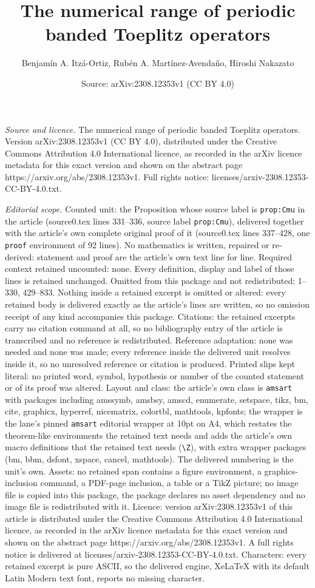 \documentclass[10pt,a4paper]{amsart}
\title[The numerical range of periodic banded Toeplitz operators]{The numerical range of periodic banded Toeplitz operators}
\author{Benjam\'in A. Itz\'a-Ortiz, Rub\'en A. Mart\'inez-Avenda\~no, Hiroshi Nakazato}
\date{Source: arXiv:2308.12353v1 (CC BY 4.0)}
\begin{document}
\maketitle

\noindent\emph{Source and licence.} The numerical range of periodic banded Toeplitz operators. Version arXiv:2308.12353v1 (CC BY 4.0), distributed under the Creative Commons Attribution 4.0 International licence, as recorded in the arXiv licence metadata for this exact version and shown on the abstract page https://arxiv.org/abs/2308.12353v1. Full rights notice: licenses/arxiv-2308.12353-CC-BY-4.0.txt.\par\smallskip

\noindent\textit{Editorial scope.} Counted unit: the Proposition whose source label is \texttt{prop:Cmu} in the article (source0.tex lines 331--336, source label \texttt{prop:Cmu}), delivered together with the article's own complete original proof of it (source0.tex lines 337--428, one \texttt{proof} environment of 92 lines). No mathematics is written, repaired or re-derived: statement and proof are the article's own text line for line. Required context retained uncounted: none. Every definition, display and label of those lines is retained unchanged. Omitted from this package and not redistributed: 1--330, 429--833. Nothing inside a retained excerpt is omitted or altered: every retained body is delivered exactly as the article's lines are written, so no omission receipt of any kind accompanies this package. Citations: the retained excerpts carry no citation command at all, so no bibliography entry of the article is transcribed and no reference is redistributed. Reference adaptation: none was needed and none was made; every reference inside the delivered unit resolves inside it, so no unresolved reference or citation is produced. Printed slips kept literal: no printed word, symbol, hypothesis or number of the counted statement or of its proof was altered. Layout and class: the article's own class is \texttt{amsart} with packages including amssymb, amsbsy, amscd, enumerate, setspace, tikz, bm, cite, graphicx, hyperref, nicematrix, colortbl, mathtools, kpfonts; the wrapper is the lane's pinned \texttt{amsart} editorial wrapper at 10pt on A4, which restates the theorem-like environments the retained text needs and adds the article's own macro definitions that the retained text needs (\texttt{\textbackslash Z}), with extra wrapper packages (bm, bbm, dsfont, xspace, cancel, mathtools). The delivered numbering is the unit's own. Assets: no retained span contains a figure environment, a graphics-inclusion command, a PDF-page inclusion, a table or a TikZ picture; no image file is copied into this package, the package declares no asset dependency and no image file is redistributed with it. Licence: version arXiv:2308.12353v1 of this article is distributed under the Creative Commons Attribution 4.0 International licence, as recorded in the arXiv licence metadata for this exact version and shown on the abstract page https://arxiv.org/abs/2308.12353v1. A full rights notice is delivered at licenses/arxiv-2308.12353-CC-BY-4.0.txt. Characters: every retained excerpt is pure ASCII, so the delivered engine, XeLaTeX with its default Latin Modern text font, reports no missing character.
\end{document}
